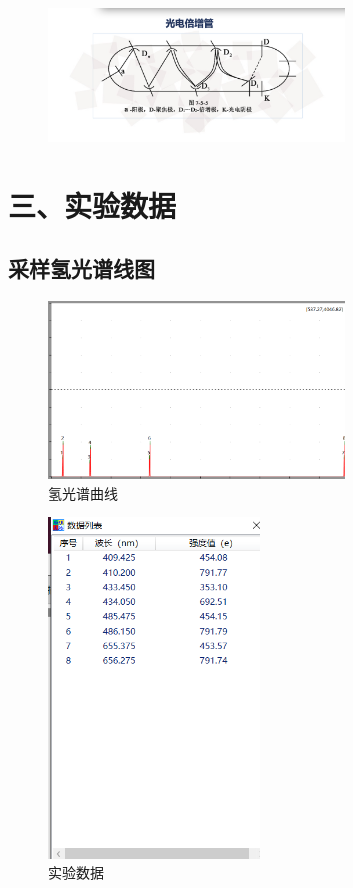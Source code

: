 \documentclass{article}
\begin{document}
    \begin{figure}[H]
        \centering
        \includegraphics[width=0.7\textwidth]{4.png}
        \end{figure}
    

\section*{三、实验数据}

\subsection*{采样氢光谱线图}

\begin{figure}[H]
    \centering
    \includegraphics[width=0.7\textwidth]{虚拟1/1.png}
    \caption{\label{Lab12}氢光谱曲线}
    \end{figure}

    \begin{figure}[H]
        \centering
        \includegraphics[width=0.5\textwidth]{虚拟1/2.png}
        \caption{\label{Lab12}实验数据}
        \end{figure}
\end{document}
